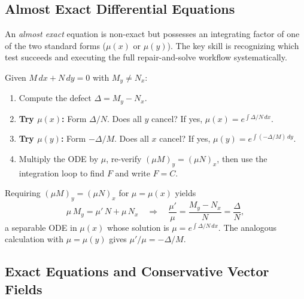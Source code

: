 \subsection{Almost Exact Differential Equations}

An \emph{almost exact} equation is non-exact but possesses an integrating
factor of one of the two standard forms ($\mu(x)$ or $\mu(y)$). The key skill
is recognizing which test succeeds and executing the full repair-and-solve
workflow systematically.

\begin{methodbox}
Given $M\,dx + N\,dy = 0$ with $M_y \neq N_x$:
\begin{enumerate}[leftmargin=1.6em, itemsep=3pt]
    \item Compute the defect $\Delta = M_y - N_x$.
    \item \textbf{Try $\mu(x)$:} Form $\Delta/N$. Does all $y$ cancel?
          If yes, $\mu(x) = e^{\int \Delta/N\,dx}$.
    \item \textbf{Try $\mu(y)$:} Form $-\Delta/M$. Does all $x$ cancel?
          If yes, $\mu(y) = e^{\int(-\Delta/M)\,dy}$.
    \item Multiply the ODE by $\mu$, re-verify $(\mu M)_y = (\mu N)_x$, then
          use the integration loop to find $F$ and write $F = C$.
\end{enumerate}
\end{methodbox}

\begin{formulabox}
Requiring $(\mu M)_y = (\mu N)_x$ for $\mu = \mu(x)$ yields
\[
  \mu\,M_y = \mu'\,N + \mu\,N_x
  \quad\Longrightarrow\quad
  \frac{\mu'}{\mu} = \frac{M_y - N_x}{N} = \frac{\Delta}{N},
\]
a separable ODE in $\mu(x)$ whose solution is $\mu = e^{\int \Delta/N\,dx}$.
The analogous calculation with $\mu = \mu(y)$ gives $\mu'/\mu = -\Delta/M$.
\end{formulabox}

\subsection{Exact Equations and Conservative Vector Fields}

